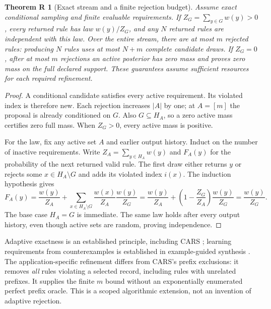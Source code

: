 \documentclass[11pt,a4paper]{article}
\newtheorem{refinement}{Theorem R}
\begin{document}
\begin{refinement}[Exact stream and a finite rejection budget]
Assume exact conditional sampling and finite evaluable requirements. If
$Z_G=\sum_{y\in G}w(y)>0$, every returned rule has law $w(y)/Z_G$, and any
$N$ returned rules are independent with this law. Over the entire stream,
there are at most $m$ rejected rules: producing $N$ rules uses at most $N+m$
complete candidate draws. If $Z_G=0$, after at most $m$ rejections an active
posterior has zero mass and proves zero mass on the full declared support.
These guarantees assume sufficient resources for each required refinement.
\end{refinement}
\begin{proof}
A conditional candidate satisfies every active requirement. Its violated
index is therefore new. Each rejection increases $|A|$ by one; at $A=[m]$
the proposal is already conditioned on $G$. Also $G\subseteq H_A$, so a zero
active mass certifies zero full mass. When $Z_G>0$, every active mass is positive.

For the law, fix any active set $A$ and earlier output history. Induct on the
number of inactive requirements. Write $Z_A=\sum_{y\in H_A}w(y)$ and
$F_A(y)$ for the probability of the next returned valid rule. The first draw
either returns $y$ or rejects some $x\in H_A\setminus G$ and adds its violated
index $i(x)$. The induction hypothesis gives
\[
 F_A(y)=\frac{w(y)}{Z_A}
 +\sum_{x\in H_A\setminus G}\frac{w(x)}{Z_A}
        \frac{w(y)}{Z_G}
 =\frac{w(y)}{Z_A}+
   \left(1-\frac{Z_G}{Z_A}\right)\frac{w(y)}{Z_G}
 =\frac{w(y)}{Z_G}.
\]
The base case $H_A=G$ is immediate. The same law holds after every output
history, even though active sets are random, proving independence.
\end{proof}

Adaptive exactness is an established principle, including CARS
\cite[Section 3 and Appendix E]{parys2025cars}; learning requirements from
counterexamples is established in example-guided synthesis
\cite{wang2017completion}. The application-specific refinement differs from
CARS's prefix exclusions: it removes \emph{all} rules violating a selected
record, including rules with unrelated prefixes. It supplies the finite $m$
bound without an exponentially enumerated perfect prefix oracle. This is
a scoped algorithmic extension, not an invention of adaptive rejection.
\end{document}
